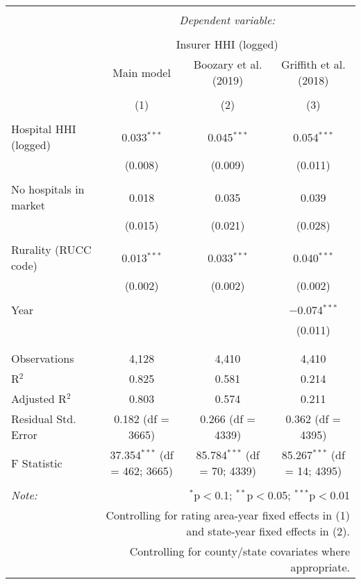
\begingroup 
\scriptsize 
\begin{tabular}{@{\extracolsep{5pt}}lccc} 
\\[-1.8ex]\hline 
\hline \\[-1.8ex] 
 & \multicolumn{3}{c}{\textit{Dependent variable:}} \\ 
\cline{2-4} 
\\[-1.8ex] & \multicolumn{3}{c}{Insurer HHI (logged)} \\ 
 & Main model & Boozary et al. (2019) & Griffith et al. (2018) \\ 
\\[-1.8ex] & (1) & (2) & (3)\\ 
\hline \\[-1.8ex] 
 Hospital HHI (logged) & 0.033$^{***}$ & 0.045$^{***}$ & 0.054$^{***}$ \\ 
  & (0.008) & (0.009) & (0.011) \\ 
  & & & \\ 
 No hospitals in market & 0.018 & 0.035 & 0.039 \\ 
  & (0.015) & (0.021) & (0.028) \\ 
  & & & \\ 
 Rurality (RUCC code) & 0.013$^{***}$ & 0.033$^{***}$ & 0.040$^{***}$ \\ 
  & (0.002) & (0.002) & (0.002) \\ 
  & & & \\ 
 Year &  &  & $-$0.074$^{***}$ \\ 
  &  &  & (0.011) \\ 
  & & & \\ 
\hline \\[-1.8ex] 
Observations & 4,128 & 4,410 & 4,410 \\ 
R$^{2}$ & 0.825 & 0.581 & 0.214 \\ 
Adjusted R$^{2}$ & 0.803 & 0.574 & 0.211 \\ 
Residual Std. Error & 0.182 (df = 3665) & 0.266 (df = 4339) & 0.362 (df = 4395) \\ 
F Statistic & 37.354$^{***}$ (df = 462; 3665) & 85.784$^{***}$ (df = 70; 4339) & 85.267$^{***}$ (df = 14; 4395) \\ 
\hline 
\hline \\[-1.8ex] 
\textit{Note:}  & \multicolumn{3}{r}{$^{*}$p$<$0.1; $^{**}$p$<$0.05; $^{***}$p$<$0.01} \\ 
 & \multicolumn{3}{r}{Controlling for rating area-year fixed effects in (1) and state-year fixed effects in (2).} \\ 
 & \multicolumn{3}{r}{Controlling for county/state covariates where appropriate.} \\ 
\end{tabular} 
\endgroup 
